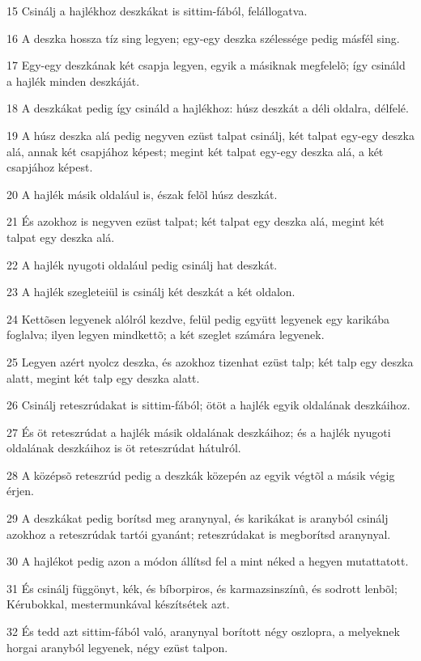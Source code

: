 \par 15 Csinálj a hajlékhoz deszkákat is sittim-fából, felállogatva.
\par 16 A deszka hossza tíz sing legyen; egy-egy deszka szélessége pedig másfél sing.
\par 17 Egy-egy deszkának két csapja legyen, egyik a másiknak megfelelõ; így csináld a hajlék minden deszkáját.
\par 18 A deszkákat pedig így csináld a hajlékhoz: húsz deszkát a déli oldalra, délfelé.
\par 19 A húsz deszka alá pedig negyven ezüst talpat csinálj, két talpat egy-egy deszka alá, annak két csapjához képest; megint két talpat egy-egy deszka alá, a két csapjához képest.
\par 20 A hajlék másik oldalául is, észak felõl húsz deszkát.
\par 21 És azokhoz is negyven ezüst talpat; két talpat egy deszka alá, megint két talpat egy deszka alá.
\par 22 A hajlék nyugoti oldalául pedig csinálj hat deszkát.
\par 23 A hajlék szegleteiül is csinálj két deszkát a két oldalon.
\par 24 Kettõsen legyenek alólról kezdve, felül pedig együtt legyenek egy karikába foglalva; ilyen legyen mindkettõ; a két szeglet számára legyenek.
\par 25 Legyen azért nyolcz deszka, és azokhoz tizenhat ezüst talp; két talp egy deszka alatt, megint két talp egy deszka alatt.
\par 26 Csinálj reteszrúdakat is sittim-fából; ötöt a hajlék egyik oldalának deszkáihoz.
\par 27 És öt reteszrúdat a hajlék másik oldalának deszkáihoz; és a hajlék nyugoti oldalának deszkáihoz is öt reteszrúdat hátulról.
\par 28 A középsõ reteszrúd pedig a deszkák közepén az egyik végtõl a másik végig érjen.
\par 29 A deszkákat pedig borítsd meg aranynyal, és karikákat is aranyból csinálj azokhoz a reteszrúdak tartói gyanánt; reteszrúdakat is megborítsd aranynyal.
\par 30 A hajlékot pedig azon a módon állítsd fel a mint néked a hegyen mutattatott.
\par 31 És csinálj függönyt, kék, és bíborpiros, és karmazsinszínû, és sodrott lenbõl; Kérubokkal, mestermunkával készítsétek azt.
\par 32 És tedd azt sittim-fából való, aranynyal borított négy oszlopra, a melyeknek horgai aranyból legyenek, négy ezüst talpon.
